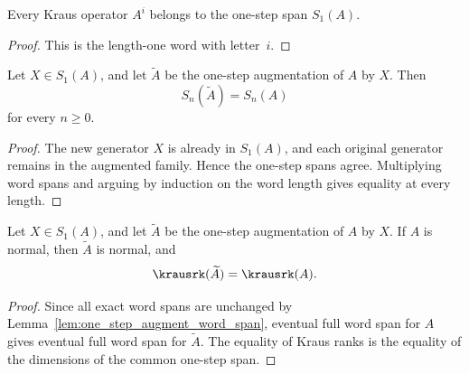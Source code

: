 \begin{lemma}\label{lem:kraus_mem_word_span_one}
    \leanok
    Every Kraus operator $A^i$ belongs to the one-step span $S_1(A)$.
\end{lemma}

\begin{proof}
    \leanok
    This is the length-one word with letter~$i$.
\end{proof}

\begin{lemma}\label{lem:one_step_augment_word_span}
    \leanok
    Let $X \in S_1(A)$, and let $\widetilde A$ be the one-step
    augmentation of $A$ by $X$. Then
    \[
        S_n(\widetilde A)=S_n(A)
    \]
    for every $n \ge 0$.
\end{lemma}

\begin{proof}
    \leanok
    The new generator $X$ is already in $S_1(A)$, and each original
    generator remains in the augmented family. Hence the one-step spans
    agree. Multiplying word spans and arguing by induction on the word
    length gives equality at every length.
\end{proof}

\begin{lemma}%
    \label{lem:one_step_augment_normal_kraus_rank}
    \leanok
    Let $X \in S_1(A)$, and let $\widetilde A$ be the one-step
    augmentation of $A$ by $X$. If $A$ is normal, then $\widetilde A$ is
    normal, and
    \[
        \krausrk(\widetilde A)=\krausrk(A).
    \]
\end{lemma}

\begin{proof}
    \leanok
    Since all exact word spans are unchanged by
    Lemma~\ref{lem:one_step_augment_word_span}, eventual full word span
    for $A$ gives eventual full word span for $\widetilde A$. The equality
    of Kraus ranks is the equality of the dimensions of the common
    one-step span.
\end{proof}

